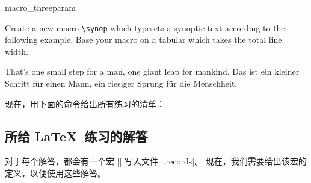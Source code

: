 \begin{dispExample}
\begin{texercise}{macro_threeparam}
\begin{tcboutputlisting}
\newcommand{\synop}[3]{%
  \begin{tabular}{@{}p{(\linewidth-\tabcolsep*2-\arrayrulewidth)/2}|%
    p{(\linewidth-\tabcolsep*2-\arrayrulewidth)/2}@{}}\hline
  \multicolumn{2}{c}{\bfseries #1}\\\hline
  \multicolumn{1}{c|}{\itshape English}&
  \multicolumn{1}{c}{\itshape German}\\\hline
  #2 & #3
  \end{tabular}}
\end{tcboutputlisting}
\tcbuselistingtext%
Create a new macro \verb+\synop+ which typesets a synoptic text according
to the following example. Base your macro on a tabular which takes the
total line width.\par\smallskip
\begin{tcbwritetemp}
%
{That's one small step for a man, one giant leap for mankind.}%
{Das ist ein kleiner Schritt f\"{u}r einen Mann,
   ein riesiger Sprung f\"{u}r die Menschheit.}
\end{tcbwritetemp}
\tcbusetemplisting\par\smallskip\tcbusetemp%
\end{texercise}
\end{dispExample}

\begin{dispListing}
\tcbstoprecording
\end{dispListing}
\tcbusetemp

\bigskip

现在，用下面的命令给出所有练习的清单：

\begin{dispListing}
\end{dispListing}
\tcbusetemp

\clearpage
\subsection{所给 \LaTeX\ 练习的解答}

对于每个解答，都会有一个宏 |\processsol| 写入文件 |\jobname.records|。
现在，我们需要给出该宏的定义，以便使用这些解答。

